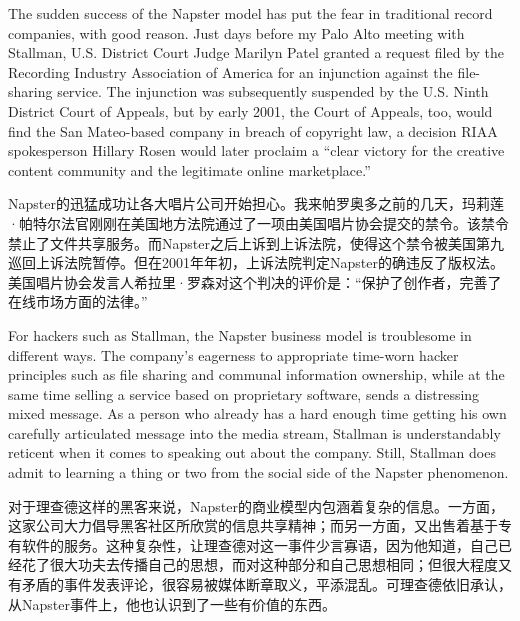 \ifdefined\eng
The sudden success of the Napster model has put the fear in traditional record companies, with good reason. Just days before my Palo Alto meeting with Stallman, U.S. District Court Judge Marilyn Patel granted a request filed by the Recording Industry Association of America for an injunction against the file-sharing service. The injunction was subsequently suspended by the U.S. Ninth District Court of Appeals, but by early 2001, the Court of Appeals, too, would find the San Mateo-based company in breach of copyright law, a decision RIAA spokesperson Hillary Rosen would later proclaim a ``clear victory for the creative content community and the legitimate online marketplace.''
\fi

\ifdefined\chs
Napster的迅猛成功让各大唱片公司开始担心。我来帕罗奥多之前的几天，玛莉莲·帕特尔法官刚刚在美国地方法院通过了一项由美国唱片协会提交的禁令。该禁令禁止了文件共享服务。而Napster之后上诉到上诉法院，使得这个禁令被美国第九巡回上诉法院暂停。但在2001年年初，上诉法院判定Napster的确违反了版权法。美国唱片协会发言人希拉里·罗森对这个判决的评价是：“保护了创作者，完善了在线市场方面的法律。”
\fi

\ifdefined\eng
For hackers such as Stallman, the Napster business model is troublesome in different ways. The company's eagerness to appropriate time-worn hacker principles such as file sharing and communal information ownership, while at the same time selling a service based on proprietary software, sends a distressing mixed message. As a person who already has a hard enough time getting his own carefully articulated message into the media stream, Stallman is understandably reticent when it comes to speaking out about the company. Still, Stallman does admit to learning a thing or two from the social side of the Napster phenomenon.
\fi

\ifdefined\chs
对于理查德这样的黑客来说，Napster的商业模型内包涵着复杂的信息。一方面，这家公司大力倡导黑客社区所欣赏的信息共享精神；而另一方面，又出售着基于专有软件的服务。这种复杂性，让理查德对这一事件少言寡语，因为他知道，自己已经花了很大功夫去传播自己的思想，而对这种部分和自己思想相同；但很大程度又有矛盾的事件发表评论，很容易被媒体断章取义，平添混乱。可理查德依旧承认，从Napster事件上，他也认识到了一些有价值的东西。
\fi

